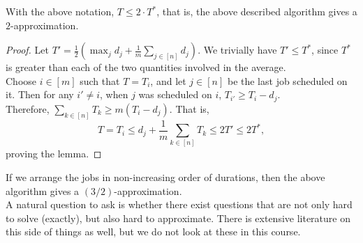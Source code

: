 	\begin{lemma}
		With the above notation, $T \leq 2\cdot T^*$, that is, the above described algorithm gives a $2$-approximation.
	\end{lemma}
	\begin{proof}
		Let $T' = \frac{1}{2} \left(\max_j d_j + \frac{1}{m} \sum_{j\in[n]} d_j\right)$. We trivially have $T' \leq T^*$, since $T^*$ is greater than each of the two quantities involved in the average.\\
		Choose $i\in[m]$ such that $T = T_i$, and let $j\in[n]$ be the last job scheduled on it. Then for any $i' \neq i$, when $j$ was scheduled on $i$, $T_{i'} \geq T_i - d_j$.\\
		Therefore, $\sum_{k\in[n]} T_k \geq m(T_i - d_j)$. That is,
		\[ T = T_i \leq d_j + \frac{1}{m} \sum_{k\in[n]} T_k \leq 2T' \leq 2T^*, \]
		proving the lemma.
	\end{proof}

	If we arrange the jobs in non-increasing order of durations, then the above algorithm gives a $(3/2)$-approximation.\\

	A natural question to ask is whether there exist questions that are not only hard to solve (exactly), but also hard to approximate. There is extensive literature on this side of things as well, but we do not look at these in this course.